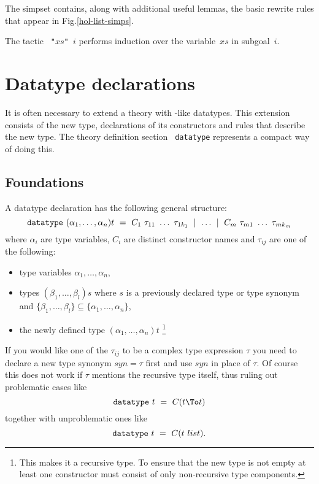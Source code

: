 The simpset  contains, along with additional useful lemmas,
the basic rewrite rules that appear in Fig.\ts\ref{hol-list-simps}.

The tactic {\tt{} "$xs$" $i$} performs induction over the
variable~$xs$ in subgoal~$i$.


\section{Datatype declarations}

\underscoreon

It is often necessary to extend a theory with \ML-like datatypes.  This
extension consists of the new type, declarations of its constructors and
rules that describe the new type. The theory definition section {\tt
  datatype} represents a compact way of doing this.


\subsection{Foundations}

A datatype declaration has the following general structure:
\[ \mbox{\tt datatype}~ (\alpha_1,\dots,\alpha_n)t ~=~
      C_1~\tau_{11}~\dots~\tau_{1k_1} ~\mid~ \dots ~\mid~
      C_m~\tau_{m1}~\dots~\tau_{mk_m} 
\]
where $\alpha_i$ are type variables, $C_i$ are distinct constructor names and
$\tau_{ij}$ are one of the following:
\begin{itemize}
\item type variables $\alpha_1,\dots,\alpha_n$,
\item types $(\beta_1,\dots,\beta_l)s$ where $s$ is a previously declared
  type or type synonym and $\{\beta_1,\dots,\beta_l\} \subseteq
  \{\alpha_1,\dots,\alpha_n\}$,
\item the newly defined type $(\alpha_1,\dots,\alpha_n)t$ \footnote{This
    makes it a recursive type. To ensure that the new type is not empty at
    least one constructor must consist of only non-recursive type
    components.}
\end{itemize}
If you would like one of the $\tau_{ij}$ to be a complex type expression
$\tau$ you need to declare a new type synonym $syn = \tau$ first and use
$syn$ in place of $\tau$. Of course this does not work if $\tau$ mentions the
recursive type itself, thus ruling out problematic cases like \[ \mbox{\tt
  datatype}~ t ~=~ C(t \To t) \] together with unproblematic ones like \[
\mbox{\tt datatype}~ t ~=~ C(t~list). \]

